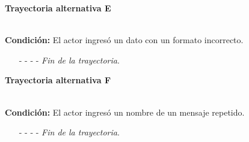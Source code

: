 \hypertarget{CU9-2:TAE}{\textbf{Trayectoria alternativa E}}\\
\noindent \textbf{Condición:} El actor ingresó un dato con un formato incorrecto.
\begin{enumerate}
	\UCpaso[\UCsist] Muestra el mensaje  señalando el campo que presenta el error en la pantalla .
	\UCpaso Regresa al paso \ref{CU9.2-P6} de la trayectoria principal o al paso \ref{CU9.2-AP-2} de la trayectoria Alternativa A.
	\item[- -] - - {\em {Fin de la trayectoria}}.
\end{enumerate}
\hypertarget{CU9-2:TAF}{\textbf{Trayectoria alternativa F}}\\
\noindent \textbf{Condición:} El actor ingresó un nombre de un mensaje repetido.
\begin{enumerate}
	\UCpaso[\UCsist] Muestra el mensaje  señalando el campo que presenta la duplicidad en la pantalla .
	\UCpaso Regresa al paso \ref{CU9.2-P6} de la trayectoria principal o al paso \ref{CU9.2-AP-2} de la trayectoria Alternativa A.
	\item[- -] - - {\em {Fin de la trayectoria}}.
\end{enumerate}